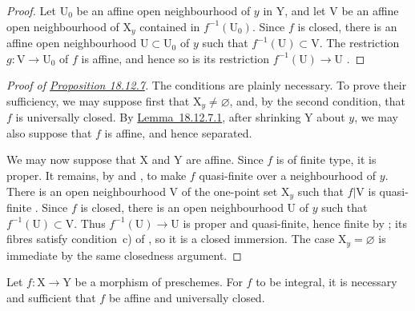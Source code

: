 \begin{proof}
Let $\mathrm{U}_0$ be an affine open neighbourhood of $y$ in $\mathrm{Y}$, and let $\mathrm{V}$ be an affine open neighbourhood of $\mathrm{X}_y$ contained in $f^{-1}(\mathrm{U}_0)$. Since $f$ is closed, there is an affine open neighbourhood $\mathrm{U}\subset\mathrm{U}_0$ of $y$ such that $f^{-1}(\mathrm{U})\subset\mathrm{V}$. The restriction $g:\mathrm{V}\to\mathrm{U}_0$ of $f$ is affine, and hence so is its restriction $f^{-1}(\mathrm{U})\to\mathrm{U}$ .
\end{proof}

\begin{proof}[Proof of {\hyperlink{ega4.c04.prop.18-12-7}{Proposition 18.12.7}}]
The conditions are plainly necessary. To prove their sufficiency, we may suppose first that $\mathrm{X}_y\ne\varnothing$, and, by the second condition, that $f$ is universally closed. By {\hyperlink{ega4.c04.lem.18-12-7-1}{Lemma~18.12.7.1}}, after shrinking $\mathrm{Y}$ about $y$, we may also suppose that $f$ is affine, and hence separated.

We may now suppose that $\mathrm{X}$ and $\mathrm{Y}$ are affine. Since $f$ is of finite type, it is proper. It remains, by  and , to make $f$ quasi-finite over a neighbourhood of $y$. There is an open neighbourhood $\mathrm{V}$ of the one-point set $\mathrm{X}_y$ such that $f|\mathrm{V}$ is quasi-finite . Since $f$ is closed, there is an open neighbourhood $\mathrm{U}$ of $y$ such that $f^{-1}(\mathrm{U})\subset\mathrm{V}$. Thus $f^{-1}(\mathrm{U})\to\mathrm{U}$ is proper and quasi-finite, hence finite by ; its fibres satisfy condition~c) of , so it is a closed immersion. The case $\mathrm{X}_y=\varnothing$ is immediate by the same closedness argument.
\end{proof}

\begin{proposition}[18.12.8]
\label{IV.18.12.8}
Let $f:\mathrm{X}\to\mathrm{Y}$ be a morphism of preschemes.
For $f$ to be integral, it is necessary and sufficient that $f$ be affine and universally closed.
\end{proposition}

